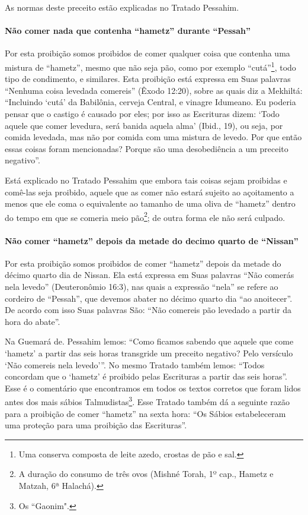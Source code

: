 As normas deste preceito estão explicadas no Tratado Pessahim.

\paragraph{Não comer nada que contenha ``hametz'' durante ``Pessah''}

Por esta proibição somos proibidos de comer qualquer coisa que contenha
uma mistura de ``hametz'', mesmo que não seja pão, como por exemplo
``cutá''\footnote{Uma conserva composta de leite azedo, crostas de pão e sal.}, todo tipo de condimento, e similares.
Esta proibição está expressa em Suas palavras ``Nenhuma coisa levedada
comereis'' (Êxodo 12:20), sobre as quais diz a Mekhiltá: ``Incluindo
`cutá' da Babilônia, cerveja Central, e vinagre Idumeano. Eu poderia
pensar que o castigo é causado por eles; por isso as Escrituras dizem:
`Todo aquele que comer levedura, será banida aquela alma' (Ibid., 19),
ou seja, por comida levedada, mas não por comida com uma mistura de
levedo. Por que então essas coisas foram mencionadas? Porque são uma
desobediência a um preceito negativo''.

Está explicado no Tratado Pessahim que embora tais coisas sejam
proibidas e comê-las seja proibido, aquele que as comer não estará
sujeito ao açoitamento a menos que ele coma o equivalente ao tamanho de
uma oliva de ``hametz'' dentro do tempo em que se comeria meio
pão\footnote{A duração do consumo de três ovos (Mishné Torah, 1º cap., Hametz e
  Matzah, 6ª Halachá).}; de outra forma ele não será culpado.

\paragraph{Não comer ``hametz'' depois da metade do decimo quarto de ``Nissan''}

Por esta proibição somos proibidos de comer ``hametz'' depois da metade
do décimo quarto dia de Nissan. Ela está expressa em Suas palavras ``Não
comerás nela levedo'' (Deuteronômio 16:3), nas quais a expressão
``nela'' se refere ao cordeiro de ``Pessah'', que devemos abater no
décimo quarto dia ``ao anoitecer''. De acordo com isso Suas palavras
São: ``Não comereis pão levedado a partir da hora do abate''.

Na Guemará de. Pessahim lemos: ``Como ficamos sabendo que aquele que
come `hametz' a partir das seis horas transgride um preceito negativo?
Pelo versículo `Não comereis nela levedo'''. No mesmo Tratado também
lemos: ``Todos concordam que o `hametz' é proibido pelas Escrituras a
partir das seis horas''. Esse é o comentário que encontramos em todos os
textos corretos que foram lidos antes dos mais sábios
Talmudistas\footnote{Os ``Gaonim".}. Esse Tratado também dá a seguinte
razão para a proibição de comer ``hametz'' na sexta hora: ``Os Sábios
estabeleceram uma proteção para uma proibição das Escrituras''.

